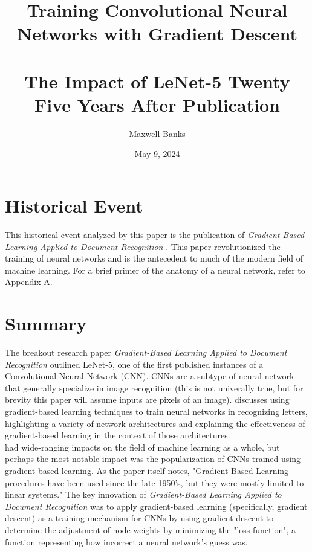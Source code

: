 \documentclass[11pt, a4paper]{article}
\title{
    Training Convolutional Neural Networks with Gradient Descent\\~\\
    \large The Impact of LeNet-5 Twenty Five Years After Publication}
\author{
    Maxwell Banks
}
\date{May 9, 2024}
\begin{document}
\nocite{*}
\maketitle
\newpage

\section{Historical Event}
This historical event analyzed by this paper is the publication of \textit{Gradient-Based Learning Applied to 
Document Recognition} \cite{lecun}. This paper revolutionized the training of neural networks and is the antecedent 
to much of the modern field of machine learning. For a brief primer of the anatomy of a neural network, refer to 
\hyperref[sec:neuralnet]{Appendix A}.

\section{Summary}
The breakout research paper \textit{Gradient-Based Learning Applied to Document Recognition} \cite{lecun}
outlined LeNet-5, one of the first published instances of a Convolutional Neural Network (CNN). CNNs are a subtype
of neural network that generally specialize in image recognition (this is not univerally true, but for brevity this
paper will assume inputs are pixels of an image). \cite{lecun} discusses using gradient-based learning 
techniques to train neural networks in recognizing letters, highlighting a variety of network architectures 
and explaining the effectiveness of gradient-based learning in the context of those architectures. \\

\cite{lecun} had wide-ranging impacts on the field of machine learning as a whole, but perhaps the most 
notable impact was the popularization of CNNs trained using gradient-based learning. As the paper itself notes, 
"Gradient-Based Learning procedures have been used since the late 1950's, but they were mostly limited to 
linear systems." \cite{lecun} The key innovation of \textit{Gradient-Based Learning Applied to Document Recognition} was to apply gradient-based 
learning (specifically, gradient descent) as a training mechanism for CNNs by using gradient descent to determine
the adjustment of node weights by minimizing the "loss function", a function representing how incorrect a neural 
network's guess was.\\
\end{document}
